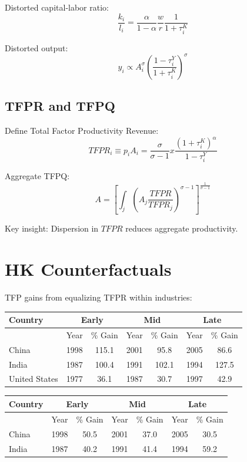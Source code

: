 \documentclass[a4paper,11pt]{article}
\newcommand{\tfpQ}{A}
\newcommand{\tfpr}{TFPR}
\begin{document}
Distorted capital-labor ratio:
\[
\frac{k_i}{l_i} = \frac{\alpha}{1-\alpha}\frac{w}{r}\frac{1}{1+\tau_i^K}
\tag{Distorted-KL}
\]

Distorted output:
\[
y_i \propto A_i^{\sigma} \left(\frac{1-\tau_i^Y}{1+\tau_i^K}\right)^{\sigma}
\tag{Distorted-Output}
\]

\subsection*{TFPR and TFPQ}

Define Total Factor Productivity Revenue:
\[
\tfpr_i \equiv p_i A_i = \frac{\sigma}{\sigma-1}x\frac{(1+\tau_i^K)^\alpha}{1-\tau_i^Y}
\tag{TFPR}
\]

Aggregate TFPQ:
\[
\tfpQ = \left[\int_j \left(A_j \frac{\tfpr}{\tfpr_j}\right)^{\sigma-1}\right]^{\frac{1}{\sigma-1}}
\tag{TFPQ}
\]

Key insight: Dispersion in $\tfpr$ reduces aggregate productivity.

\section{HK Counterfactuals}

TFP gains from equalizing TFPR within industries:

\begin{center}
\begin{tabular}{lcccccc}
\toprule
Country & \multicolumn{2}{c}{Early} & \multicolumn{2}{c}{Mid} & \multicolumn{2}{c}{Late} \\
\midrule
 & Year & \% Gain & Year & \% Gain & Year & \% Gain \\
\midrule
China & 1998 & 115.1 & 2001 & 95.8 & 2005 & 86.6 \\
India & 1987 & 100.4 & 1991 & 102.1 & 1994 & 127.5 \\
United States & 1977 & 36.1 & 1987 & 30.7 & 1997 & 42.9 \\
\bottomrule
\end{tabular}
\end{center}

\begin{center}
\begin{tabular}{lcccccc}
\toprule
Country & \multicolumn{2}{c}{Early} & \multicolumn{2}{c}{Mid} & \multicolumn{2}{c}{Late} \\
\midrule
 & Year & \% Gain & Year & \% Gain & Year & \% Gain \\
\midrule
China & 1998 & 50.5 & 2001 & 37.0 & 2005 & 30.5 \\
India & 1987 & 40.2 & 1991 & 41.4 & 1994 & 59.2 \\
\bottomrule
\end{tabular}
\end{center}
\end{document}

